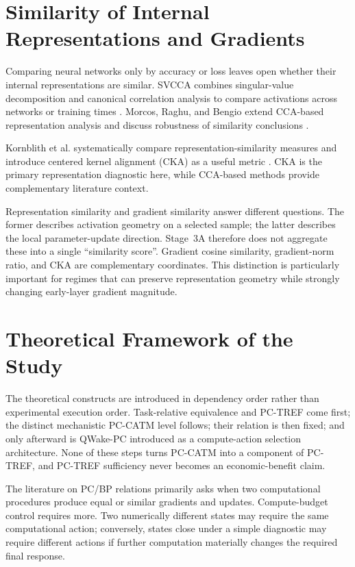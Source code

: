\section{Similarity of Internal Representations and Gradients}
\label{sec:related-representations}

Comparing neural networks only by accuracy or loss leaves open whether their internal
representations are similar. SVCCA combines singular-value decomposition and canonical
correlation analysis to compare activations across networks or training times
\cite{raghu2017svcca}. Morcos, Raghu, and Bengio extend CCA-based representation
analysis and discuss robustness of similarity conclusions \cite{morcos2018insights}.

Kornblith et al. systematically compare representation-similarity measures and
introduce centered kernel alignment (CKA) as a useful metric
\cite{kornblith2019similarity}. CKA is the primary representation diagnostic here,
while CCA-based methods provide complementary literature context.

Representation similarity and gradient similarity answer different questions. The
former describes activation geometry on a selected sample; the latter describes the
local parameter-update direction. Stage~3A therefore does not aggregate these into a
single ``similarity score''. Gradient cosine similarity, gradient-norm ratio, and CKA
are complementary coordinates. This distinction is particularly important for regimes
that can preserve representation geometry while strongly changing early-layer gradient
magnitude.

\section{Theoretical Framework of the Study}
\label{sec:theory-framework}

The theoretical constructs are introduced in dependency order rather than experimental
execution order. Task-relative equivalence and PC-TREF come first; the distinct
mechanistic PC-CATM level follows; their relation is then fixed; and only afterward is
QWake-PC introduced as a compute-action selection architecture. None of these steps
turns PC-CATM into a component of PC-TREF, and PC-TREF sufficiency never becomes an
economic-benefit claim.

The literature on PC/BP relations primarily asks when two computational procedures
produce equal or similar gradients and updates. Compute-budget control requires more.
Two numerically different states may require the same computational action; conversely,
states close under a simple diagnostic may require different actions if further
computation materially changes the required final response.

